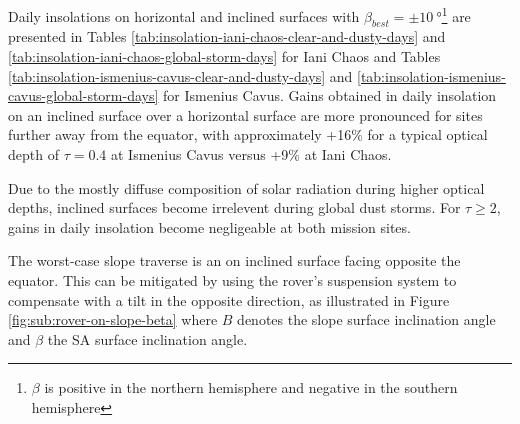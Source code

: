 \clearpage

Daily insolations on horizontal and inclined surfaces with $\beta_{best}=\pm\SI{10}{\degree}$\footnote{$\beta$ is positive in the northern hemisphere and negative in the southern hemisphere} are presented in Tables \ref{tab:insolation-iani-chaos-clear-and-dusty-days} and \ref{tab:insolation-iani-chaos-global-storm-days} for Iani Chaos and Tables \ref{tab:insolation-ismenius-cavus-clear-and-dusty-days} and \ref{tab:insolation-ismenius-cavus-global-storm-days} for Ismenius Cavus. Gains obtained in daily insolation on an inclined surface over a horizontal surface are more pronounced for sites further away from the equator, with approximately +16\% for a typical optical depth of $\tau = 0.4$ at Ismenius Cavus versus +9\% at Iani Chaos.





Due to the mostly diffuse composition of solar radiation during higher optical depths, inclined surfaces become irrelevent during global dust storms. For $\tau \geq 2$, gains in daily insolation become negligeable at both mission sites.


\clearpage




The worst-case slope traverse is an on inclined surface facing opposite the equator. This can be mitigated by using the rover's suspension system to compensate with a tilt in the opposite direction, as illustrated in Figure \ref{fig:sub:rover-on-slope-beta} where $B$ denotes the slope surface inclination angle and $\beta$ the \ac{SA} surface inclination angle.

\vspace{0.5cm}

